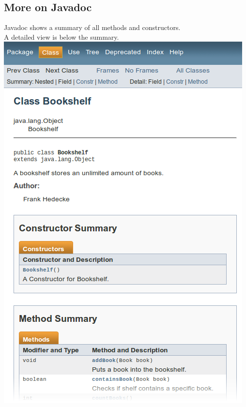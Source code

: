 \subsection{More on Javadoc}
\begin{frame}
	Javadoc shows a summary of all methods and constructors. \\
	A detailed view is below the summary.
	\vfill
	\includegraphics[scale=0.25]{res/javadoc_shelf_left.png}

\end{frame}
